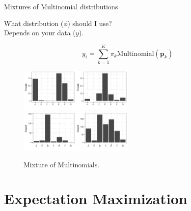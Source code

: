 \documentclass[10pt]{beamer}
\begin{document}
\begin{frame}{Mixtures of Multinomial distributions}

What {\color{uured} distribution} ($\phi$) should I use?\\
\pause
\vspace{2mm}
Depends on your {\color{uured} data} ($y$).
\pause

\[
y_i = \sum_{k=1}^K \pi_k \text{Multinomial}(\mathbf{p}_k)
\]

\begin{figure}[h]
\centering
\includegraphics[width=0.25\textwidth]{fig/clu1.png}\includegraphics[width=0.25\textwidth]{fig/clu2.png}\\
\includegraphics[width=0.25\textwidth]{fig/clu3.png}\includegraphics[width=0.25\textwidth]{fig/clu4.png}
\caption{Mixture of Multinomials.}
\end{figure}

\end{frame}


\section{Expectation Maximization}
\end{document}
